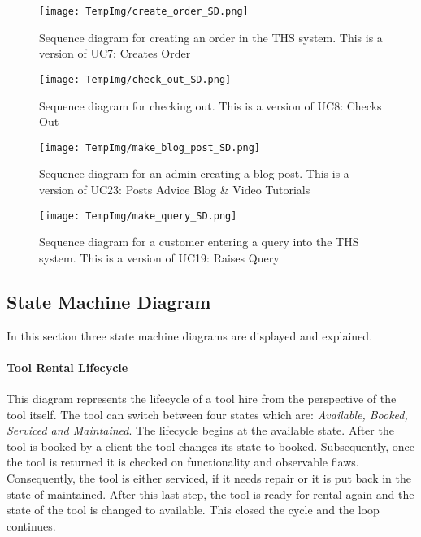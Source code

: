 \documentclass[fontsize=11pt]{extarticle}
\numberwithin{figure}{section} %
\numberwithin{table}{section}%
\let\oldparagraph\paragraph
\renewcommand{\paragraph}[1]{\oldparagraph{#1}\mbox{}}
\begin{document}
\begin{figure}[H]
      \centering
      \texttt{[image: TempImg/create\_order\_SD.png]}
      \caption{Sequence diagram for creating an order in the THS system. This is a version of UC7: Creates Order}
\end{figure}

\begin{figure}[H]
      \centering
      \texttt{[image: TempImg/check\_out\_SD.png]}
      \caption{Sequence diagram for checking out. This is a version of UC8: Checks Out}
\end{figure}

\begin{figure}[H]
      \centering
      \texttt{[image: TempImg/make\_blog\_post\_SD.png]}
      \caption{Sequence diagram for an admin creating a blog post. This is a version of UC23: Posts Advice Blog & Video Tutorials}
\end{figure}

\begin{figure}[H]
      \centering
      \texttt{[image: TempImg/make\_query\_SD.png]}
      \caption{Sequence diagram for a customer entering a query into the THS system. This is a version of UC19: Raises Query}
\end{figure}

\hypertarget{state-machine-diagram}{%
\subsection{State Machine Diagram}\label{state-machine-diagram}}

In this section three state machine diagrams are displayed and
explained.

\hypertarget{tool-rental-lifecycle}{%
\paragraph{Tool Rental Lifecycle}\label{tool-rental-lifecycle}}

This diagram represents the lifecycle of a tool hire from the
perspective of the tool itself. The tool can switch between four states
which are: \textit{Available, Booked, Serviced and Maintained}. The
lifecycle begins at the available state. After the tool is booked by a
client the tool changes its state to booked. Subsequently, once the tool
is returned it is checked on functionality and observable flaws.
Consequently, the tool is either serviced, if it needs repair or it is
put back in the state of maintained. After this last step, the tool is
ready for rental again and the state of the tool is changed to
available. This closed the cycle and the loop continues.
\end{document}

